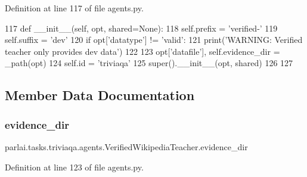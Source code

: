 Definition at line 117 of file agents.\+py.


\begin{DoxyCode}
117     \textcolor{keyword}{def }\_\_init\_\_(self, opt, shared=None):
118         self.prefix = \textcolor{stringliteral}{'verified-'}
119         self.suffix = \textcolor{stringliteral}{'dev'}
120         \textcolor{keywordflow}{if} opt[\textcolor{stringliteral}{'datatype'}] != \textcolor{stringliteral}{'valid'}:
121             print(\textcolor{stringliteral}{'WARNING: Verified teacher only provides dev data'})
122 
123         opt[\textcolor{stringliteral}{'datafile'}], self.evidence\_dir = \_path(opt)
124         self.id = \textcolor{stringliteral}{'triviaqa'}
125         super().\_\_init\_\_(opt, shared)
126 
127 
\end{DoxyCode}


\subsection{Member Data Documentation}
\mbox{\label{classparlai_1_1tasks_1_1triviaqa_1_1agents_1_1VerifiedWikipediaTeacher_a214e3d671d59a23a43315ccd367d8702}} 
\subsubsection{\texorpdfstring{evidence\+\_\+dir}{evidence\_dir}}
{\footnotesize\ttfamily parlai.\+tasks.\+triviaqa.\+agents.\+Verified\+Wikipedia\+Teacher.\+evidence\+\_\+dir}



Definition at line 123 of file agents.\+py.

\mbox{\label{classparlai_1_1tasks_1_1triviaqa_1_1agents_1_1VerifiedWikipediaTeacher_a37b2fd9a409408905a62cec4436774f2}} 
